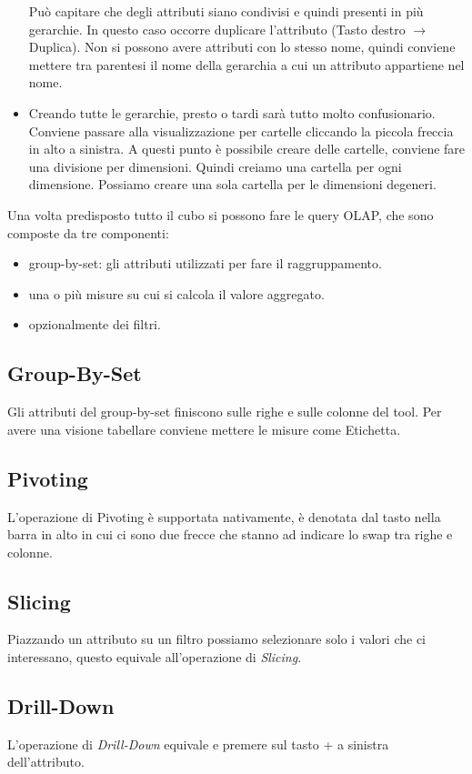 \begin{itemize}
	Può capitare che degli attributi siano condivisi e quindi presenti in più gerarchie. In questo caso occorre duplicare l'attributo (Tasto destro $\xrightarrow{}$ Duplica). Non si possono avere attributi con lo stesso nome, quindi conviene mettere tra parentesi il nome della gerarchia a cui un attributo appartiene nel nome.\newline
	\item Creando tutte le gerarchie, presto o tardi sarà tutto molto confusionario. Conviene passare alla visualizzazione per cartelle cliccando la piccola freccia in alto a sinistra. A questi punto è possibile creare delle cartelle, conviene fare una divisione per dimensioni. Quindi creiamo una cartella per ogni dimensione. Possiamo creare una sola cartella per le dimensioni degeneri.
\end{itemize}
Una volta predisposto tutto il cubo si possono fare le query OLAP, che sono composte da tre componenti:
\begin{itemize}
	\item group-by-set: gli attributi utilizzati per fare il raggruppamento.
	\item una o più misure su cui si calcola il valore aggregato.
	\item opzionalmente dei filtri.
\end{itemize}
\subsection{Group-By-Set}
Gli attributi del group-by-set finiscono sulle righe e sulle colonne del tool. Per avere una visione tabellare conviene mettere le misure come Etichetta.
\subsection{Pivoting}
L'operazione di Pivoting è supportata nativamente, è denotata dal tasto nella barra in alto in cui ci sono due frecce che stanno ad indicare lo swap tra righe e colonne.
\subsection{Slicing}
Piazzando un attributo su un filtro possiamo selezionare solo i valori che ci interessano, questo equivale all'operazione di \textit{Slicing}.\newline
\subsection{Drill-Down}
L'operazione di \textit{Drill-Down} equivale e premere sul tasto + a sinistra dell'attributo.
